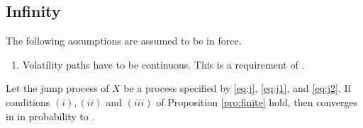 \subsection{Infinity}
The following assumptions are assumed to be in force.
\begin{ass} \label{fubini}
  \begin{enumerate}
    \item Volatility paths have to be continuous. This is a requirement of  \cite{Zhang2008}. 
  \end{enumerate}
\end{ass}
\begin{prop}
  Let the jump process of $X$ be a  \levy process specified by \eqref{eq:j}, \eqref{eq:j1}, and \eqref{eq:j2}. 
  If conditions $(i), (ii)$ and $(iii)$ of Proposition \eqref{pro:finite} hold, then 
  \jvn converges in \Ltwo in probability to \sv.
\end{prop}
